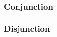 \vspace{-5pt}
\newcommand{\separatepfs}{\vspace{-10pt}\hrulefill\vspace{-5pt}}
\begin{multicols}{2}
\subsubsection*{Conjunction}

\begin{pf}
	 
\end{pf}

\vfill\null
\columnbreak

\begin{pf}
	 
\end{pf}
\smallskip
\begin{pf}
	 
\end{pf}
\end{multicols}

\separatepfs
\begin{multicols}{2}
\subsubsection*{Disjunction}

\begin{pf}
\end{pf}
\smallskip
\begin{pf}
\end{pf}

\vfill\null
\columnbreak

\begin{pf}
	\open
		\ellipsesline
	\close
	\open
		\ellipsesline
	\close
	 
\end{pf}
\end{multicols}

